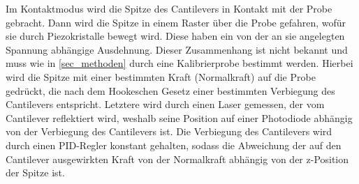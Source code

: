 \documentclass[
	a4paper,
	12pt,
	pagesize,
	ngerman
]{scrartcl}
\begin{document}
	Im Kontaktmodus wird die Spitze des Cantilevers in Kontakt mit der Probe gebracht.
	Dann wird die Spitze in einem Raster über die Probe gefahren, wofür sie durch Piezokristalle bewegt wird.
	Diese haben ein von der an sie angelegten Spannung abhängige Ausdehnung.
	Dieser Zusammenhang ist nicht bekannt und muss wie in \cref{sec_methoden} durch eine Kalibrierprobe bestimmt werden.
	Hierbei wird die Spitze mit einer bestimmten Kraft (Normalkraft) auf die Probe gedrückt, die nach dem Hookeschen Gesetz einer bestimmten Verbiegung des Cantilevers entspricht.
	Letztere wird durch einen Laser gemessen, der vom Cantilever  reflektiert wird, weshalb seine Position auf einer Photodiode abhängig von der Verbiegung des Cantilevers ist.%
	Die Verbiegung des Cantilevers wird durch einen PID-Regler konstant gehalten, sodass die Abweichung der auf den Cantilever ausgewirkten Kraft von der Normalkraft abhängig von der z-Position der Spitze ist. %
	
\end{document}
